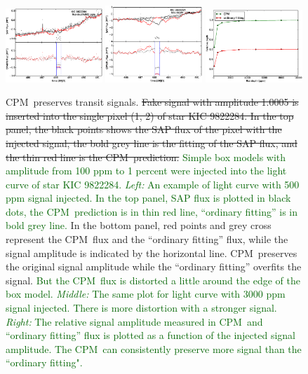 \documentclass[12pt, preprint]{aastex}
\newcommand{\name}{CPM}
\newcommand{\revise}[1]{\textcolor{darkgreen}{#1}}
\newcommand{\remove}[1]{\sout{#1}}
\begin{document}
\begin{figure}[p]
\begin{center}
\includegraphics[width=0.325\textwidth]{f4a}
\includegraphics[width=0.325\textwidth]{f4b}
\includegraphics[width=0.325\textwidth]{f4c}
\end{center}
\caption{
  \label{distortion} 
  \name\ preserves transit signals.
  \remove{Fake signal with amplitude 1.0005 is inserted into the single pixel (1, 2) of star KIC 9822284.
  In the top panel, the black points shows the SAP flux of the pixel with the injected signal, the bold grey line is the fitting of the SAP flux, and the thin red line is the \name\ prediction.}
  \revise{Simple box models with amplitude from 100 ppm to 1 percent were injected into the light curve of star KIC 9822284. 
  \emph{Left:} An example of light curve with 500 ppm signal injected. In the top panel, SAP flux is plotted in black dots, the \name\ prediction is in thin red line, ``ordinary fitting'' is in bold grey line.}
  In the bottom panel, red points and grey cross represent the \name\ flux and the ``ordinary fitting'' flux, while the signal amplitude is indicated by the horizontal line. 
  \name\ preserves the original signal amplitude while the ``ordinary fitting'' overfits the signal. \revise{But the \name\ flux is distorted a little around the edge of the box model.
  \emph{Middle:} The same plot for light curve with 3000 ppm signal injected. There is more distortion with a stronger signal.
  \emph{Right:} The relative signal amplitude measured in \name\ and ``ordinary fitting'' flux is plotted as a function of the injected signal amplitude. The \name\ can consistently preserve more signal than the ``ordinary fitting".}}
\end{figure}
\end{document}
